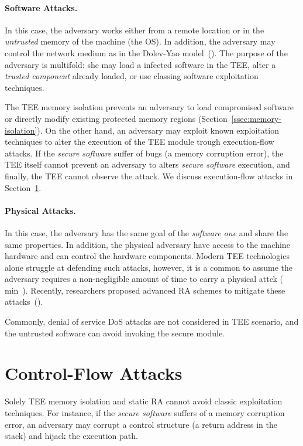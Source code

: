 \paragraph{Software Attacks.} 
In this case, the adversary works either from a remote location or in the 
\emph{untrusted} memory of the machine (\eg the OS).
In addition, the adversary may control the network medium as in the Dolev-Yao 
model~(\cite{dolev}).
The purpose of the adversary is multifold: she may load a infected software in 
the TEE, alter a \emph{trusted component} already loaded, or use classing 
software exploitation techniques.

The TEE memory isolation prevents an adversary to load compromised software or 
directly modify existing protected memory regions 
(Section~\ref{ssec:memory-isolation}).
On the other hand, an adversary may exploit known exploitation techniques to 
alter the execution of the TEE module trough execution-flow attacks.
If the \emph{secure software} suffer of bugs (\eg a memory corruption error), 
the TEE itself cannot prevent an adversary to alters \emph{secure software} 
execution, and finally, the TEE cannot observe the attack.
We discuss execution-flow attacks in Section~\ref{sec:control-flow-attacks}.

\paragraph{Physical Attacks.}
In this case, the adversary has the same goal of the \emph{software 
one} and share the same properties. In addition, the physical adversary have 
access to the machine hardware and can control the hardware components.
Modern TEE technologies alone struggle at defending such attacks, however, it 
is a common to assume the adversary requires a non-negligible amount of time to 
carry a physical attck (
min~\cite{conti2010smallville,conti2008emergent,darpa,ibrahim2017seed,pasta,us-aid}).
Recently, researchers proposed advanced RA schemes to mitigate these 
attacks~(\cite{darpa,visintin2019safe,pasta}).

Commonly, denial of service DoS attacks are not considered in TEE scenario, and 
the untrusted software can avoid invoking the secure module.

\section{Control-Flow Attacks}
\label{sec:control-flow-attacks}

Solely TEE memory isolation and static RA cannot avoid classic exploitation 
techniques.
For instance, if the \emph{secure software} suffers of a memory corruption 
error, an adversary may corrupt a control structure (\ie a return address in 
the stack) and hijack the execution path.

